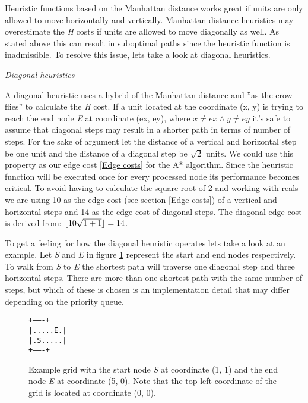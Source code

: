 \documentclass[12pt, a4paper]{article}
\DeclarePairedDelimiter{\floor}{\lfloor}{\rfloor}
\begin{document}
Heuristic functions based on the Manhattan distance works great if units are
only allowed to move horizontally and vertically. Manhattan distance heuristics
may overestimate the \textit{H} costs if units are allowed to move diagonally as
well. As stated above this can result in suboptimal paths since the heuristic
function is inadmissible. To resolve this issue, lets take a look at diagonal
heuristics.

\textit{Diagonal heuristics}

A diagonal heuristic uses a hybrid of the Manhattan distance and ''as the crow
flies'' to calculate the \textit{H} cost. If a unit located at the coordinate
(x, y) is trying to reach the end node \textit{E} at coordinate (ex, ey), where
$ x \ne ex \land y \ne ey $ it's safe to assume that diagonal steps may result
in a shorter path in terms of number of steps. For the sake of argument let the
distance of a vertical and horizontal step be one unit and the distance of a
diagonal step be $ \sqrt{2} $ units. We could use this property as our edge cost
\ref{Edge costs} for the A* algorithm. Since the heuristic function will be
executed once for every processed node its performance becomes critical. To
avoid having to calculate the square root of 2 and working with reals we are
using 10 as the edge cost (see section \ref{Edge costs}) of a vertical and
horizontal steps and 14 as the edge cost of diagonal steps. The diagonal edge
cost is derived from: $ \floor{10 \sqrt{1+1}} = 14 $.

To get a feeling for how the diagonal heuristic operates lets take a look at an
example. Let \textit{S} and \textit{E} in figure \ref{fig:grid1} represent the
start and end nodes respectively. To walk from \textit{S} to \textit{E} the
shortest path will traverse one diagonal step and three horizontal steps. There
are more than one shortest path with the same number of steps, but which of
these is chosen is an implementation detail that may differ depending on the
priority queue.

\begin{figure}[htbp]
	\centering
	\texttt{+-------+ \\
|.....E.| \\
|.S.....| \\
+-------+}
	\caption{\label{fig:grid1} Example grid with the start node \textit{S} at
	coordinate (1, 1) and the end node \textit{E} at coordinate (5, 0). Note that
	the top left coordinate of the grid is located at coordinate (0, 0).}
\end{figure}
\end{document}
